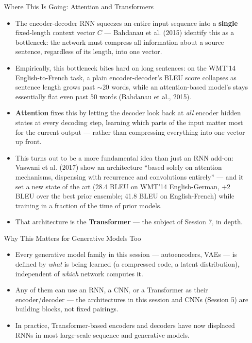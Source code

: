 \begin{vbframe}{Where This Is Going: Attention and Transformers}
  \begin{itemize}
    \item The encoder-decoder RNN squeezes an entire input sequence into a \textbf{single} fixed-length context vector $C$ --- Bahdanau et al. (2015) identify this as a bottleneck: the network must compress all information about a source sentence, regardless of its length, into one vector.
    \item Empirically, this bottleneck bites hard on long sentences: on the WMT'14 English-to-French task, a plain encoder-decoder's BLEU score collapses as sentence length grows past $\sim$20 words, while an attention-based model's stays essentially flat even past 50 words (Bahdanau et al., 2015).
    \item \textbf{Attention} fixes this by letting the decoder look back at \textit{all} encoder hidden states at every decoding step, learning which parts of the input matter most for the current output --- rather than compressing everything into one vector up front.
    \item This turns out to be a more fundamental idea than just an RNN add-on: Vaswani et al. (2017) show an architecture ``based solely on attention mechanisms, dispensing with recurrence and convolutions entirely'' --- and it set a new state of the art (28.4 BLEU on WMT'14 English-German, +2 BLEU over the best prior ensemble; 41.8 BLEU on English-French) while training in a fraction of the time of prior models.
    \item That architecture is the \textbf{Transformer} --- the subject of Session 7, in depth.
  \end{itemize}
\end{vbframe}

\begin{vbframe}{Why This Matters for Generative Models Too}
  \begin{itemize}
    \item Every generative model family in this session --- autoencoders, VAEs --- is defined by \textit{what} is being learned (a compressed code, a latent distribution), independent of \textit{which} network computes it.
    \item Any of them can use an RNN, a CNN, or a Transformer as their encoder/decoder --- the architectures in this session and CNNs (Session 5) are building blocks, not fixed pairings.
    \item In practice, Transformer-based encoders and decoders have now displaced RNNs in most large-scale sequence and generative models.
  \end{itemize}
\end{vbframe}

